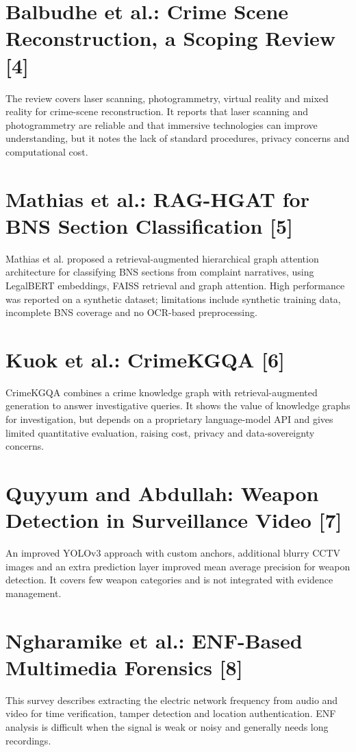 \documentclass[12pt,a4paper,oneside]{report}
\begin{document}
\section{Balbudhe et al.: Crime Scene Reconstruction, a Scoping Review [4]}
The review covers laser scanning, photogrammetry, virtual reality and mixed reality for crime-scene reconstruction. It reports that laser scanning and photogrammetry are reliable and that immersive technologies can improve understanding, but it notes the lack of standard procedures, privacy concerns and computational cost.

\section{Mathias et al.: RAG-HGAT for BNS Section Classification [5]}
Mathias et al. proposed a retrieval-augmented hierarchical graph attention architecture for classifying BNS sections from complaint narratives, using LegalBERT embeddings, FAISS retrieval and graph attention. High performance was reported on a synthetic dataset; limitations include synthetic training data, incomplete BNS coverage and no OCR-based preprocessing.

\section{Kuok et al.: CrimeKGQA [6]}
CrimeKGQA combines a crime knowledge graph with retrieval-augmented generation to answer investigative queries. It shows the value of knowledge graphs for investigation, but depends on a proprietary language-model API and gives limited quantitative evaluation, raising cost, privacy and data-sovereignty concerns.

\section{Quyyum and Abdullah: Weapon Detection in Surveillance Video [7]}
An improved YOLOv3 approach with custom anchors, additional blurry CCTV images and an extra prediction layer improved mean average precision for weapon detection. It covers few weapon categories and is not integrated with evidence management.

\section{Ngharamike et al.: ENF-Based Multimedia Forensics [8]}
This survey describes extracting the electric network frequency from audio and video for time verification, tamper detection and location authentication. ENF analysis is difficult when the signal is weak or noisy and generally needs long recordings.
\end{document}
